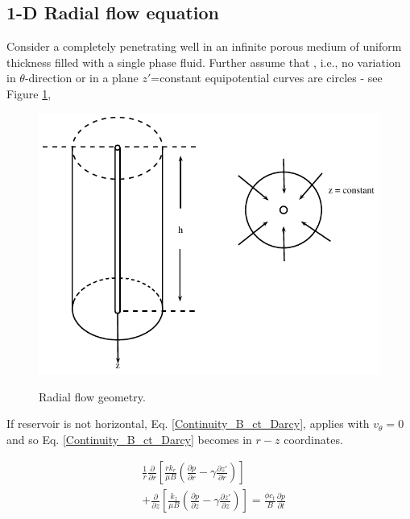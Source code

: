 \documentclass{llncs}
\numberwithin{equation}{section}
\numberwithin{figure}{section}
\numberwithin{table}{section}
\begin{document}
    \subsection{1-D Radial flow equation}
    Consider a completely penetrating well in an infinite porous medium of uniform thickness filled with a single phase fluid. Further assume that , i.e., no variation in $\theta$-direction or in a plane $z'$=constant equipotential curves are circles - see Figure \ref{Radial_Flow},
    \begin{figure}
        \begin{center}
        \includegraphics[scale=1]{Radial_Flow.pdf}
        \label{Radial_Flow}
        \caption{Radial flow geometry.}
        \end{center}
    \end{figure}
    
    If reservoir is not horizontal,  Eq. \ref{Continuity_B_ct_Darcy}, applies with $v_{\theta}=0$ and so Eq. \ref{Continuity_B_ct_Darcy} becomes in $r-z$ coordinates.
    
    \begin{equation}
        \begin{split}
    & \frac{1}{r}\frac{\partial }{\partial r}\left[ \frac{r{{k}_{r}}}{\mu B}\left( \frac{\partial p}{\partial r}-\gamma \frac{\partial z'}{\partial r} \right) \right] \\
    & +\frac{\partial }{\partial z}\left[ \frac{{{k}_{z}}}{\mu B}\left( \frac{\partial p}{\partial z}-\gamma \frac{\partial z'}{\partial z} \right) \right]=\frac{\phi {{c}_{t}}}{B}\frac{\partial p}{\partial t} \\
    \end{split}
        \label{Radial_Flow}
    \end{equation}
    
\end{document}
